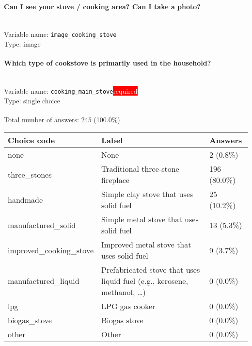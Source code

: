 \documentclass[11.5pt, a4paper]{scrartcl}
\begin{document}
\paragraph{Can I see your stove / cooking area? Can I take a photo?}
\  \\Variable name: \texttt{image\_cooking\_stove}\\
Type: image\\
\paragraph{Which type of cookstove is primarily used in the household?}
\  \\Variable name: \texttt{cooking\_main\_stove}\hfill\colorbox{red}{\small{\textcolor{white}{required}}}\\
 Type: single choice\\
\\Total number of answers: 245 (100.0\%)
\\[0.2em] \begin{tabular}{p{4cm}|p{8cm}|p{3cm}}
Choice code & Label & Answers \\
\hline
none & None& \cellcolor{color0}2 (0.8\%)\\
\cellcolor{mygray} three\_stones & \cellcolor{mygray}Traditional three-stone fireplace & \cellcolor{color3}196 (80.0\%)\\
handmade & Simple clay stove that uses solid fuel& \cellcolor{color0}25 (10.2\%)\\
\cellcolor{mygray} manufactured\_solid & \cellcolor{mygray}Simple metal stove that uses solid fuel & \cellcolor{color0}13 (5.3\%)\\
improved\_cooking\_stove & Improved metal stove that uses solid fuel& \cellcolor{color0}9 (3.7\%)\\
\cellcolor{mygray} manufactured\_liquid & \cellcolor{mygray}Prefabricated stove that uses liquid fuel (e.g., kerosene, methanol, …) & \cellcolor{color0}0 (0.0\%)\\
lpg & LPG gas cooker& \cellcolor{color0}0 (0.0\%)\\
\cellcolor{mygray} biogas\_stove & \cellcolor{mygray}Biogas stove  & \cellcolor{color0}0 (0.0\%)\\
other & Other& \cellcolor{color0}0 (0.0\%)\\
\end{tabular}
\end{document}
